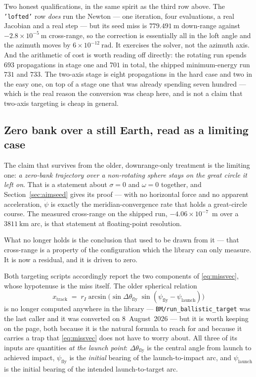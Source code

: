 \documentclass[11pt]{article}
\newcommand{\code}[1]{\texttt{#1}}
\begin{document}
Two honest qualifications, in the same spirit as the third row above. The
\code{'lofted'} row \emph{does} run the Newton --- one iteration, four
evaluations, a real Jacobian and a real step --- but its seed miss is
$779.491~\mathrm{m}$ down-range against $-2.8\times10^{-5}~\mathrm{m}$
cross-range, so the correction is essentially all in the loft angle and the
azimuth moves by $6\times10^{-12}~\mathrm{rad}$. It exercises the solver, not
the azimuth axis. And the arithmetic of cost is worth reading off directly: the
rotating run spends $693$ propagations in stage one and $701$ in total, the
shipped minimum-energy run $731$ and $733$. The two-axis stage is eight
propagations in the hard case and two in the easy one, on top of a stage one
that was already spending seven hundred --- which is the real reason the
conversion was cheap here, and is not a claim that two-axis targeting is cheap
in general.

\subsection{Zero bank over a still Earth, read as a limiting case}
\label{sec:crossrange}

The claim that survives from the older, downrange-only treatment is the
limiting one: \emph{a zero-bank trajectory over a non-rotating sphere stays on
the great circle it left on}. That is a statement about $\sigma=0$ and
$\omega=0$ together, and Section~\ref{sec:aimseed} gives its proof --- with no
horizontal force and no apparent acceleration, $\dot\psi$ is exactly the
meridian-convergence rate that holds a great-circle course. The measured
cross-range on the shipped run, $-4.06\times10^{-7}$~m over a
$3811~\mathrm{km}$ arc, is that statement at floating-point resolution.

What no longer holds is the conclusion that used to be drawn from it --- that
cross-range is a property of the configuration which the library can only
measure. It is now a residual, and it is driven to zero.

Both targeting scripts accordingly report the two components of
\eqref{eq:missvec}, whose hypotenuse is the miss itself. The older spherical
relation
\begin{equation}
  x_{\text{track}} \;=\; r_I \arcsin\!\bigl(
     \sin\Delta\theta_{\text{fly}}\;
     \sin(\psi_{\text{fly}} - \psi_{\text{launch}})\bigr)
  \label{eq:xtrack}
\end{equation}
is no longer computed anywhere in the library --- \code{BM/run\_ballistic\_target}
was the last caller and it was converted on 8~August~2026 --- but it is worth
keeping on the page, both because it is the natural formula to reach for and
because it carries a trap that \eqref{eq:missvec} does not have to worry about.
All three of its inputs are quantities \emph{at the launch
point}: $\Delta\theta_{\text{fly}}$ is the central angle from launch to
achieved impact, $\psi_{\text{fly}}$ is the \emph{initial} bearing of the
launch-to-impact arc, and $\psi_{\text{launch}}$ is the initial bearing of the
intended launch-to-target arc.
\end{document}

